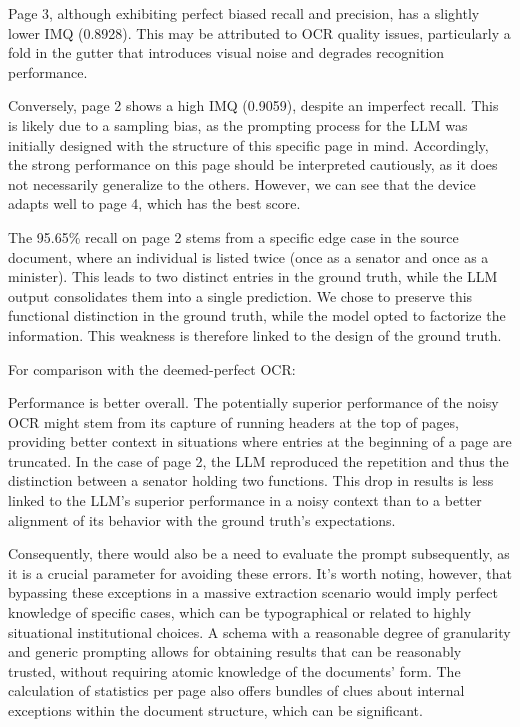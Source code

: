 Page 3, although exhibiting perfect biased recall and precision, has a slightly lower IMQ (0.8928). This may be attributed to OCR quality issues, particularly a fold in the gutter that introduces visual noise and degrades recognition performance.

Conversely, page 2 shows a high IMQ (0.9059), despite an imperfect recall. This is likely due to a sampling bias, as the prompting process for the LLM was initially designed with the structure of this specific page in mind. Accordingly, the strong performance on this page should be interpreted cautiously, as it does not necessarily generalize to the others. However, we can see that the device adapts well to page 4, which has the best score.

The 95.65\% recall on page 2 stems from a specific edge case in the source document, where an individual is listed twice (once as a senator and once as a minister). This leads to two distinct entries in the ground truth, while the LLM output consolidates them into a single prediction. We chose to preserve this functional distinction in the ground truth, while the model opted to factorize the information. This weakness is therefore linked to the design of the ground truth.

For comparison with the deemed-perfect OCR:

\begin{adjustbox}{width=\textwidth, center}
\end{adjustbox}

Performance is better overall. The potentially superior performance of the noisy OCR might stem from its capture of running headers at the top of pages, providing better context in situations where entries at the beginning of a page are truncated. In the case of page 2, the LLM reproduced the repetition and thus the distinction between a senator holding two functions. This drop in results is less linked to the LLM's superior performance in a noisy context than to a better alignment of its behavior with the ground truth's expectations.

Consequently, there would also be a need to evaluate the prompt subsequently, as it is a crucial parameter for avoiding these errors. It's worth noting, however, that bypassing these exceptions in a massive extraction scenario would imply perfect knowledge of specific cases, which can be typographical or related to highly situational institutional choices. A schema with a reasonable degree of granularity and generic prompting allows for obtaining results that can be reasonably trusted, without requiring atomic knowledge of the documents' form. The calculation of statistics per page also offers bundles of clues about internal exceptions within the document structure, which can be significant.
